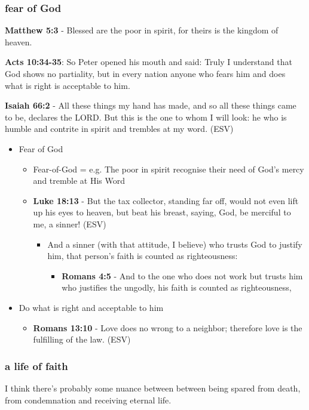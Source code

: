 \documentclass[11pt]{article}
\begin{document}
\subsubsection{fear of God}
\label{sec:orgaccb998}
\textbf{Matthew 5:3} - Blessed are the poor in spirit, for theirs is the kingdom of heaven.

\textbf{Acts 10:34-35}: So Peter opened his mouth and said: Truly I understand that God shows no partiality, but in every nation anyone who fears him and does what is right is acceptable to him.

\textbf{Isaiah 66:2} - All these things my hand has made, and so all these things came to be, declares the LORD. But this is the one to whom I will look: he who is humble and contrite in spirit and trembles at my word. (ESV)

\begin{itemize}
\item Fear of God
\begin{itemize}
\item Fear-of-God = e.g. The poor in spirit recognise their need of God's mercy and tremble at His Word
\item \textbf{Luke 18:13} - But the tax collector, standing far off, would not even lift up his eyes to heaven, but beat his breast, saying, God, be merciful to me, a sinner! (ESV)
\begin{itemize}
\item And a sinner (with that attitude, I believe) who trusts God to justify him, that person's faith is counted as righteousness:
\begin{itemize}
\item \textbf{Romans 4:5} - And to the one who does not work but trusts him who justifies the ungodly, his faith is counted as righteousness,
\end{itemize}
\end{itemize}
\end{itemize}
\item Do what is right and acceptable to him
\begin{itemize}
\item \textbf{Romans 13:10} - Love does no wrong to a neighbor; therefore love is the fulfilling of the law. (ESV)
\end{itemize}
\end{itemize}

\subsubsection{a life of faith}
\label{sec:org3751513}
I think there's probably some nuance between between being spared from death, from condemnation and receiving eternal life.
\end{document}
